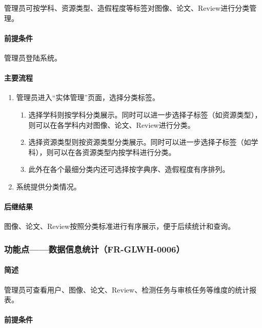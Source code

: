 {管理员可按学科、资源类型、造假程度等标签对图像、论文、Review进行分类管理。

\paragraph*{前提条件}

管理员登陆系统。

\paragraph*{主要流程}

\begin{enumerate}
    \item 管理员进入“实体管理”页面，选择分类标签。
    \begin{enumerate}
        \item 选择学科则按学科分类展示。同时可以进一步选择子标签（如资源类型），则可以在各学科内对图像、论文、Review进行分类。
        \item 选择资源类型则按资源类型分类展示。同时可以进一步选择子标签（如学科），则可以在各资源类型内按学科进行分类。
        \item 此外在各个最细分类内还可选择按字典序、造假程度有序排列。
    \end{enumerate}
    \item 系统提供分类情况。
\end{enumerate}

\paragraph*{后继结果}

图像、论文、Review按照分类标准进行有序展示，便于后续统计和查询。

\subsubsection{功能点——数据信息统计（FR-GLWH-0006）}

\paragraph*{简述}

管理员可查看用户、图像、论文、Review、检测任务与审核任务等维度的统计报表。

\paragraph*{前提条件}

}
